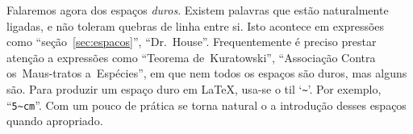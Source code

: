 Falaremos agora dos espaços \emph{duros}. Existem palavras que estão naturalmente ligadas, e não toleram quebras de linha entre si. Isto acontece em expressões como ``seção~\ref{sec:espacos}'', ``Dr.\ House''. Frequentemente é preciso prestar atenção a expressões como ``Teorema de~Kuratowski'', ``Associação Contra os~Maus-tratos a~Espécies'', em que nem todos os espaços são duros, mas alguns são.
Para produzir um espaço duro em \LaTeX, usa-se o til `\verb'~''. Por exemplo, ``\verb'5~cm'''. Com um pouco de prática se torna natural o a introdução desses espaços quando apropriado.


